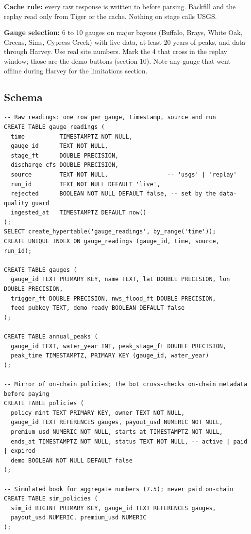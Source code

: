 \documentclass[11pt]{article}
\newcommand{\code}[1]{\texttt{\detokenize{#1}}}
\begin{document}
\textbf{Cache rule:} every raw response is written to \code{/data/cache/} before parsing. Backfill and the replay read only from Tiger or the cache. Nothing on stage calls USGS.

\textbf{Gauge selection:} 6 to 10 gauges on major bayous (Buffalo, Brays, White Oak, Greens, Sims, Cypress Creek) with live data, at least 20 years of peaks, and data through Harvey. Use real site numbers. Mark the 4 that cross \code{trigger_ft} in the replay window; those are the demo buttons (section 10). Note any gauge that went offline during Harvey for the limitations section.

\subsection{Schema}
\begin{lstlisting}[style=sql]
-- Raw readings: one row per gauge, timestamp, source and run
CREATE TABLE gauge_readings (
  time          TIMESTAMPTZ NOT NULL,
  gauge_id      TEXT NOT NULL,
  stage_ft      DOUBLE PRECISION,
  discharge_cfs DOUBLE PRECISION,
  source        TEXT NOT NULL,                 -- 'usgs' | 'replay'
  run_id        TEXT NOT NULL DEFAULT 'live',
  rejected      BOOLEAN NOT NULL DEFAULT false, -- set by the data-quality guard
  ingested_at   TIMESTAMPTZ DEFAULT now()
);
SELECT create_hypertable('gauge_readings', by_range('time'));
CREATE UNIQUE INDEX ON gauge_readings (gauge_id, time, source, run_id);

CREATE TABLE gauges (
  gauge_id TEXT PRIMARY KEY, name TEXT, lat DOUBLE PRECISION, lon DOUBLE PRECISION,
  trigger_ft DOUBLE PRECISION, nws_flood_ft DOUBLE PRECISION,
  feed_pubkey TEXT, demo_ready BOOLEAN DEFAULT false
);

CREATE TABLE annual_peaks (
  gauge_id TEXT, water_year INT, peak_stage_ft DOUBLE PRECISION,
  peak_time TIMESTAMPTZ, PRIMARY KEY (gauge_id, water_year)
);

-- Mirror of on-chain policies; the bot cross-checks on-chain metadata before paying
CREATE TABLE policies (
  policy_mint TEXT PRIMARY KEY, owner TEXT NOT NULL,
  gauge_id TEXT REFERENCES gauges, payout_usd NUMERIC NOT NULL,
  premium_usd NUMERIC NOT NULL, starts_at TIMESTAMPTZ NOT NULL,
  ends_at TIMESTAMPTZ NOT NULL, status TEXT NOT NULL, -- active | paid | expired
  demo BOOLEAN NOT NULL DEFAULT false
);

-- Simulated book for aggregate numbers (7.5); never paid on-chain
CREATE TABLE sim_policies (
  sim_id BIGINT PRIMARY KEY, gauge_id TEXT REFERENCES gauges,
  payout_usd NUMERIC, premium_usd NUMERIC
);


\end{lstlisting}
\end{document}
